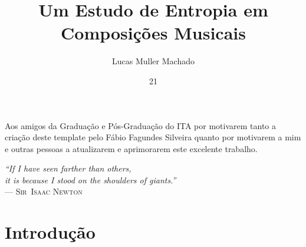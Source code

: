 \documentclass[tg]{ita}    %
\author{Lucas Muller Machado}{de Oliveira}
\title{Um Estudo de Entropia em Composições Musicais}
\date{21}{novembro}{2017}
\begin{document}
\maketitle

\begin{itadedication}
Aos amigos da Graduação e Pós-Graduação do ITA por motivarem tanto a criação deste template pelo Fábio Fagundes Silveira quanto por motivarem a mim e outras pessoas a atualizarem e aprimorarem este excelente trabalho.
\end{itadedication}

\begin{itathanks}

\end{itathanks}

\thispagestyle{empty}
\ifhyperref{}\fi
\begin{flushright}
\begin{spacing}{1}
\mbox{}\vfill
{\sffamily\itshape
``If I have seen farther than others,\\
it is because I stood on the shoulders of giants.''\\}
--- \textsc{Sir~Isaac Newton}
\end{spacing}
\end{flushright}

\begin{abstract}

\end{abstract}

\begin{englishabstract}

\end{englishabstract}

\listoffigures %

\listoftables %

\listofabbreviations

\listofsymbols

\tableofcontents

\mainmatter

\chapter{Introdução}

\end{document}
